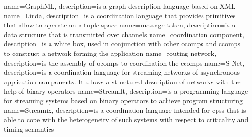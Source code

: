 {
    name=GraphML,
    description={is a graph description language based on XML}
}
{
    name=Linda,
    description={is a coordination language that provides primitives that allow to operate on a tuple space}
}
{
    name=message token,
    description={is a data structure that is transmitted over channels}
}
{
    name=coordination component,
    description={is a white box, used in conjunction with other \glspl{ocomp} and \glspl{ccomp} to construct a network forming the application}
}
{
    name=routing network,
    description={is the assembly of \glspl{ocomp} to coordination the \glspl{ccomp}}
}
{
    name=S-Net,
    description={is a coordination language for streaming networks of asynchronous application components. It allows a structured description of networks with the help of binary operators}
}
{
    name=StreamIt,
    description={is a programming language for streaming systems based on binary operators to achieve program structuring}
}
{
    name=Streamix,
    description={is a coordination language intended for \glspl{cps} that is able to cope with the heterogeneity of such systems with respect to criticality and timing semantics}
}
